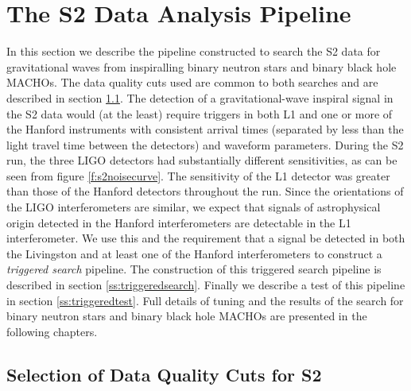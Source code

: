 \section{The S2 Data Analysis Pipeline}
\label{s:s2pipeline}

In this section we describe the pipeline constructed to search the S2 data for
gravitational waves from inspiralling binary neutron stars and binary black
hole MACHOs. The data quality cuts used are common to both searches and are
described in section \ref{ss:s2dqselection}. The detection of a
gravitational-wave inspiral signal in the S2 data would (at the least) require
triggers in both L1 and one or more of the Hanford instruments with consistent
arrival times (separated by less than the light travel time between the
detectors) and waveform parameters. During the S2 run, the three LIGO
detectors had substantially different sensitivities, as can be seen from
figure \ref{f:s2noisecurve}. The sensitivity of the L1 detector was greater
than those of the Hanford detectors throughout the run. Since the orientations
of the LIGO interferometers are similar, we expect that signals of
astrophysical origin detected in the Hanford interferometers are detectable in
the L1 interferometer.  We use this and the requirement that a signal be
detected in both the Livingston and at least one of the Hanford
interferometers to construct a {\em triggered search} pipeline. The
construction of this triggered search pipeline is described in section
\ref{ss:triggeredsearch}. Finally we describe a test of this pipeline in
section \ref{ss:triggeredtest}. Full details of tuning and the results of the
search for binary neutron stars and binary black hole MACHOs are presented in
the following chapters.

\subsection{Selection of Data Quality Cuts for S2}
\label{ss:s2dqselection}

